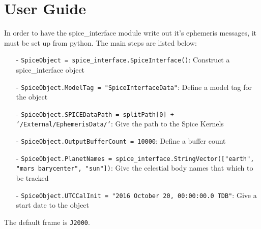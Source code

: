 \section{User Guide}

In order to have the spice\_interface module write out it's ephemeris messages, it must be set up from python. The main steps are listed below:

\begin{itemize}
 \item[-]   \texttt{SpiceObject = spice\_interface.SpiceInterface()}: Construct a spice\_interface object
  \item[-]  \texttt{SpiceObject.ModelTag = "SpiceInterfaceData"}: Define a model tag for the object
 \item[-]  \texttt{SpiceObject.SPICEDataPath = splitPath[0] + '/External/EphemerisData/'}: Give the path to the Spice Kernels
  \item[-]  \texttt{SpiceObject.OutputBufferCount = 10000}: Define a buffer count
 \item[-]  \texttt{SpiceObject.PlanetNames = spice\_interface.StringVector(["earth", "mars barycenter", "sun"])}: Give the celestial body names that which to be tracked
\item[-]  \texttt{SpiceObject.UTCCalInit = "2016 October 20, 00:00:00.0 TDB"}: Give a start date to the object
\end{itemize}

The default frame is \texttt{J2000}.
